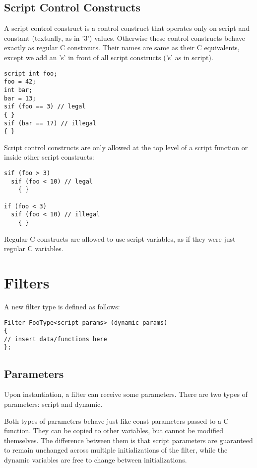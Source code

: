 \documentclass[twocolumn, draft]{article}
\begin{document}
\subsection{Script Control Constructs}

A script control construct is a control construct that operates only on
script and constant (textually, as in '3') values.  Otherwise these
control constructs behave exactly as regular C constrcuts.  Their names
are same as their C equivalents, except we add an 's' in front of all
script constructs ('s' as in script).

\begin{verbatim}
script int foo;
foo = 42;
int bar;
bar = 13;
sif (foo == 3) // legal
{ }
sif (bar == 17) // illegal
{ }
\end{verbatim}

Script control constructs are only allowed at the top level of a
script function or inside other script constructs:

\begin{verbatim}
sif (foo > 3)
  sif (foo < 10) // legal
    { }

if (foo < 3)
  sif (foo < 10) // illegal
    { }
\end{verbatim}

Regular C constructs are allowed to use script variables, as if they were
just regular C variables.


\section{Filters}
A new filter type is defined as follows:

\begin{verbatim}
Filter FooType<script params> (dynamic params)
{
// insert data/functions here
};
\end{verbatim}

\subsection{Parameters}

Upon instantiation, a filter can receive some parameters.  There are two
types of parameters:  script and dynamic.

Both types of parameters behave just like const parameters passed to a C 
function.  They can be copied to other variables, but cannot be modified
themselves.  The difference between them is that script parameters are
guaranteed to remain unchanged across multiple initializations of the
filter, while the dynamic variables are free to change between initializations.
\end{document}
